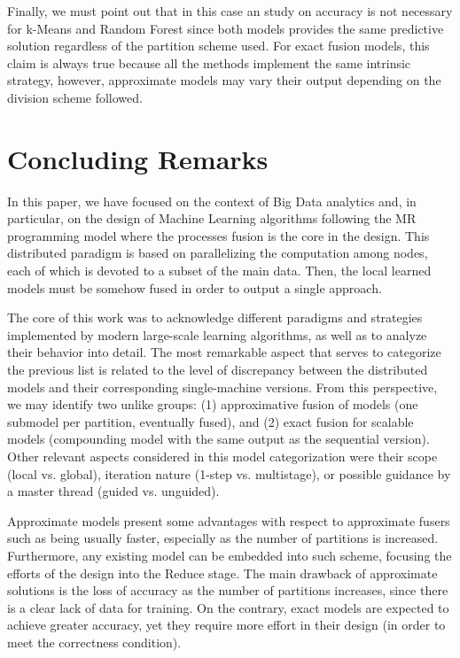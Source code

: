 \documentclass[3p,review]{elsarticle}
\begin{document}
	Finally, we must point out that in this case an study on accuracy is not necessary for k-Means and Random Forest since both models provides the same predictive solution regardless of the partition scheme used. For exact fusion models, this claim is always true because all the methods implement the same intrinsic strategy, however, approximate models may vary their output depending on the division scheme followed.  
	
	\section{Concluding Remarks}\label{sec:conclusions}
	
	In this paper, we have focused on the context of Big Data analytics and, in particular, on the design of Machine Learning algorithms following the MR programming model where the processes fusion is the core in the design. This distributed paradigm is based on parallelizing the computation among nodes, each of which is devoted to a subset of the main data. Then, the local learned models must be somehow fused in order to output a single approach. %
	
	The core of this work was to acknowledge different paradigms and strategies implemented by modern large-scale learning algorithms, as well as to analyze their behavior into detail. The most remarkable aspect that serves to categorize the previous list is related to the level of discrepancy between the distributed models and their corresponding single-machine versions. From this perspective, we may identify two unlike groups: (1) approximative fusion of models (one submodel per partition, eventually fused), and (2) exact fusion for scalable models (compounding model with the same output as the sequential version). Other relevant aspects considered in this model categorization were their scope (local vs. global), iteration nature (1-step vs. multistage), or possible guidance by a master thread (guided vs. unguided).
	
	Approximate models present some advantages with respect to approximate fusers such as being usually faster, especially as the number of partitions is increased. Furthermore, any existing model can be embedded into such scheme, focusing the efforts of the design into the Reduce stage. The main drawback of approximate solutions is the loss of accuracy as the number of partitions increases, since there is a clear lack of data for training. On the contrary, exact models are expected to achieve greater accuracy, yet they require more effort in their design (in order to meet the correctness condition).
	
\end{document}
